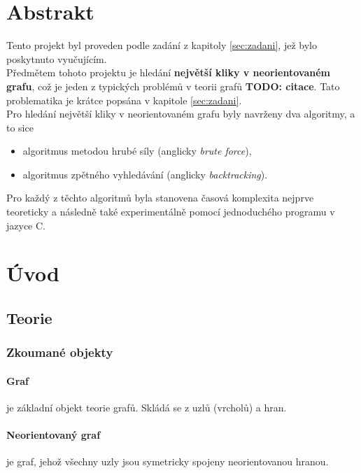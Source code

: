 \documentclass[a4paper]{article}
\begin{document}
\section{Abstrakt} \label{sec:abstrakt}
    Tento projekt byl proveden podle zadání z kapitoly \ref{sec:zadani}, jež bylo poskytnuto vyučujícím.\\
    
    \noindent
    Předmětem tohoto projektu je hledání \textbf{největší kliky v neorientovaném grafu}, což je jeden z typických problémů v teorii grafů \textbf{TODO: citace}. Tato problematika je krátce popsána v kapitole \ref{sec:zadani}.\\
    
    \noindent
    Pro hledání největší kliky v neorientovaném grafu byly navrženy dva algoritmy, a to sice
    \begin{itemize}
        \item algoritmus metodou hrubé síly (anglicky \textit{brute force}),
        \item algoritmus zpětného vyhledávání (anglicky \textit{backtracking}).
    \end{itemize}
    Pro každý z těchto algoritmů byla stanovena časová komplexita nejprve teoreticky a následně také experimentálně pomocí jednoduchého programu v jazyce C.
    
\section{Úvod} \label{sec:teorie}
    \subsection{Teorie}
        \subsubsection{Zkoumané objekty}
            \paragraph{Graf} je základní objekt teorie grafů. Skládá se z uzlů (vrcholů) a hran.\cite{slu_zaklad-teo-grafu}
            
            \paragraph{Neorientovaný graf}
            je graf, jehož všechny uzly jsou symetricky spojeny neorientovanou hranou.\cite{slu_zaklad-teo-grafu}
            
\end{document}
